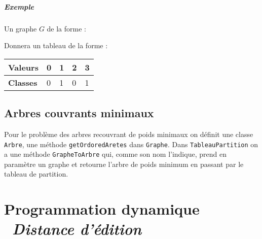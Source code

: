 \documentclass[12pt, a4paper]{report}
\begin{document}
{    \paragraph{Exemple}

    Un graphe $G$ de la forme :

    \begin{figure}[h]
        \centering
    \end{figure}

    Donnera un tableau de la forme :

    \begin{table}[h]
    \centering
    \label{my-label}
    \begin{tabular}{|l|l|l|l|l|}
    \hline
    \textbf{Valeurs} & 0 & 1 & 2 & 3 \\ \hline
    \textbf{Classes} & 0 & 1 & 0 & 1 \\ \hline
    \end{tabular}
    \end{table}

    \section{Arbres couvrants minimaux}

    Pour le problème des arbres recouvrant de poids minimaux on définit une classe \texttt{Arbre}, une méthode \texttt{getOrdoredAretes} dans \texttt{Graphe}. Dans \texttt{TableauPartition} on a une méthode \texttt{GrapheToArbre} qui, comme son nom l'indique, prend en paramètre un graphe et retourne l'arbre de poids minimum en passant par le tableau de partition.

\chapter[Programmation dynamique. Distance d'édition]{Programmation dynamique {\ \normalfont\emph{Distance d'édition}}}

}
\end{document}
